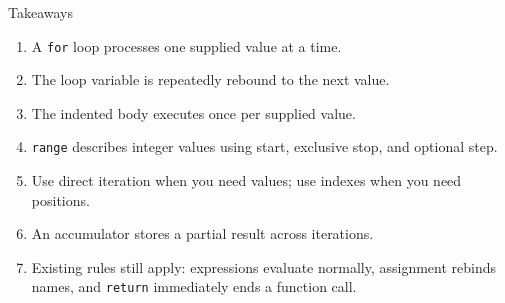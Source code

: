 \documentclass[aspectratio=169,10pt]{beamer}
\begin{document}
\begin{frame}{Takeaways}
  \begin{enumerate}
    \item A \texttt{for} loop processes one supplied value at a time.
    \item The loop variable is repeatedly rebound to the next value.
    \item The indented body executes once per supplied value.
    \item \texttt{range} describes integer values using start, exclusive stop, and optional step.
    \item Use direct iteration when you need values; use indexes when you need positions.
    \item An accumulator stores a partial result across iterations.
    \item Existing rules still apply: expressions evaluate normally, assignment rebinds names, and \texttt{return} immediately ends a function call.
  \end{enumerate}
\end{frame}
\end{document}
